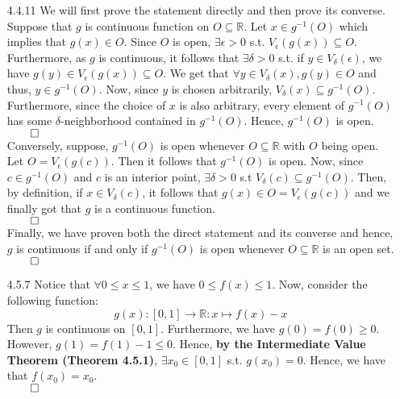 \documentclass[11pt]{article}
\newcommand{\reals}{\mathbb{R}}
\begin{document}
\begin{itemize}
    \item[4.4.11]
        We will first prove the statement directly and then prove its converse.
        \\
        Suppose that $g$ is continuous function on $O \subseteq \reals$. Let $x
        \in g^{-1}(O)$ which implies that $g(x) \in O$. Since $O$ is open,
        $\exists \epsilon > 0$ s.t. $V_\epsilon(g(x)) \subseteq O$.
        Furthermore, as $g$ is continuous, it follows that $\exists \delta > 0$
        s.t. if $y \in V_\delta(\epsilon)$, we have $g(y) \in V_\epsilon(g(x))
        \subseteq O$. We get that $\forall y \in V_\delta(x), g(y) \in O$ and
        thus, $y \in g^{-1}(O)$. Now, since $y$ is chosen arbitrarily,
        $V_\delta(x) \subseteq g^{-1}(O)$. Furthermore, since the choice of $x$
        is also arbitrary, every element of $g^{-1}(O)$ has some
        $\delta$-neighborhood contained in $g^{-1}(O)$. Hence, $g^{-1}(O)$ is
        open.\\
        $\qed$
        \\
        Conversely, suppose, $g^{-1}(O)$ is open whenever $O \subseteq \reals$
        with $O$ being open. Let $O = V_\epsilon(g(c))$. Then it follows that
        $g^{-1}(O)$ is open. Now, since $c \in g^{-1}(O)$ and $c$ is an
        interior point, $\exists \delta > 0$ s.t $V_\delta(c) \subseteq
        g^{-1}(O)$. Then, by definition, if $x \in V_\delta(c)$, it follows
        that $g(x) \in O = V_\epsilon(g(c))$ and we finally got that $g$ is a
        continuous function.\\
        $\qed$
        \\
        Finally, we have proven both the direct statement and its converse and
        hence, $g$ is continuous if and only if $g^{-1}(O)$ is open whenever $O
        \subseteq \reals$ is an open set.\\
        $\qed$

    \item[4.5.7]
        Notice that $\forall 0 \leq x \leq 1$, we have $0 \leq f(x) \leq 1$.
        Now, consider the following function:
        \begin{equation*}
            g(x) : [0, 1] \to \reals : x \mapsto f(x) - x
        \end{equation*}
        Then $g$ is continuous on $[0, 1]$. Furthermore, we have $g(0) = f(0)
        \geq 0$. However, $g(1) = f(1) - 1 \leq 0$. Hence, \textbf{by the
        Intermediate Value Theorem (Theorem 4.5.1)}, $\exists x_0 \in [0, 1]$
        s.t.  $g(x_0) = 0$.  Hence, we have that $f(x_0) = x_0$.\\
        $\qed$
\end{itemize}

\end{document}
